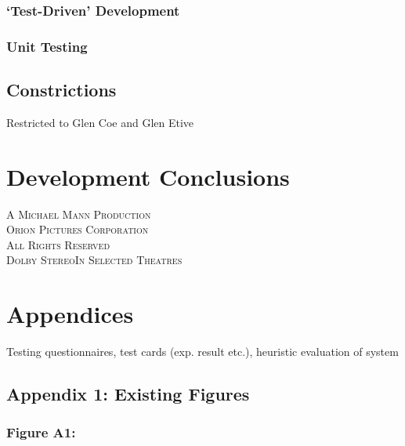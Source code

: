 \documentclass[11pt, english]{article}
\begin{document}
		\subsubsection{`Test-Driven' Development}

		\subsubsection{Unit Testing}

	\subsection{Constrictions}

	Restricted to Glen Coe and Glen Etive

\newpage

\section{Development Conclusions}\label{ch8}

	\vspace{\fill}

	\begin{center}
		\textsc{A Michael Mann Production}\\
		\textsc{ Orion Pictures Corporation}\\
		\textsc{\small{All Rights Reserved}}\\
		\textsc{Dolby Stereo}\texttrademark \textsc{In Selected Theatres}
	\end{center}

\newpage



\section*{Appendices}

	Testing questionnaires, test cards (exp. result etc.), heuristic evaluation of system

	\subsection*{Appendix 1: Existing Figures}

		\subsubsection*{Figure A1:}
			
\end{document}

